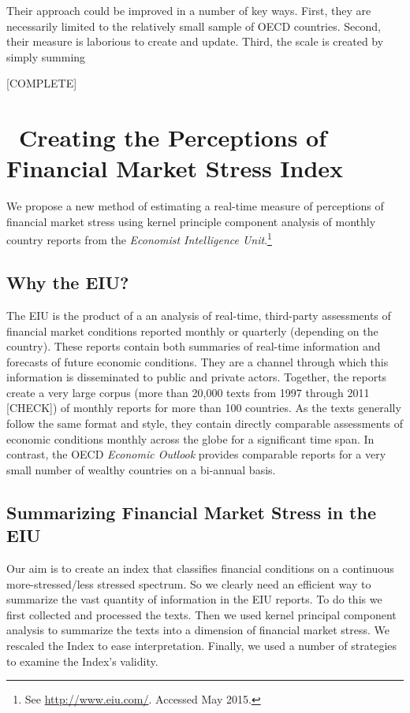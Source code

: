 \documentclass[]{article}
\begin{document}
Their approach could be improved in a number of key ways. First, they
are necessarily limited to the relatively small sample of OECD
countries. Second, their measure is laborious to create and update.
Third, the scale is created by simply summing

{[}COMPLETE{]}

\section{~Creating the Perceptions of Financial Market Stress
Index}\label{creating-the-perceptions-of-financial-market-stress-index}

We propose a new method of estimating a real-time measure of perceptions
of financial market stress using kernel principle component analysis \citep{Scholkopf1998,lodhi2002,Spirling2012} of monthly country reports from the \emph{Economist Intelligence Unit}.\footnote{See \url{http://www.eiu.com/}. Accessed May 2015.}

\subsection{Why the EIU?}\label{why-the-eiu}

The EIU is the product of a an analysis of real-time, third-party
assessments of financial market conditions reported monthly or quarterly
(depending on the country). These reports contain both summaries of
real-time information and forecasts of future economic conditions. They
are a channel through which this information is disseminated to public
and private actors. Together, the reports create a very large corpus
(more than 20,000 texts from 1997 through 2011 {[}CHECK{]}) of monthly
reports for more than 100 countries. As the texts generally follow the
same format and style, they contain directly comparable assessments of
economic conditions monthly across the globe for a significant time
span. In contrast, the OECD \emph{Economic Outlook} provides comparable
reports for a very small number of wealthy countries on a bi-annual
basis.

\subsection{Summarizing Financial Market Stress in the
EIU}\label{summarizing-financial-market-stress-in-the-eiu}

Our aim is to create an index that classifies financial conditions on a
continuous more-stressed/less stressed spectrum. So we clearly need an
efficient way to summarize the vast quantity of information in the EIU
reports. To do this we first collected and processed the texts. Then we
used kernel principal component analysis to summarize the texts into a
dimension of financial market stress. We rescaled the Index to ease
interpretation. Finally, we used a number of strategies to examine the
Index's validity.
\end{document}
